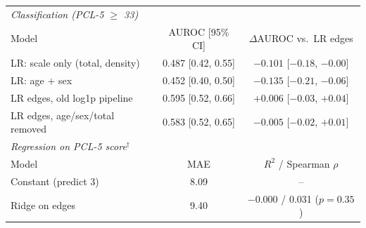 \begin{tabular}{lcc}
\toprule
\multicolumn{3}{l}{\emph{Classification (PCL-5 $\geq$ 33)}} \\
Model & AUROC [95\% CI] & $\Delta$AUROC vs.\ LR edges \\
\midrule
LR: scale only (total, density) & 0.487 [0.42, 0.55] & $-0.101$ [$-0.18$, $-0.00$] \\
LR: age + sex & 0.452 [0.40, 0.50] & $-0.135$ [$-0.21$, $-0.06$] \\
LR edges, old log1p pipeline & 0.595 [0.52, 0.66] & $+0.006$ [$-0.03$, $+0.04$] \\
LR edges, age/sex/total removed & 0.583 [0.52, 0.65] & $-0.005$ [$-0.02$, $+0.01$] \\
\midrule
\multicolumn{3}{l}{\emph{Regression on PCL-5 score}$^\dagger$} \\
Model & MAE & $R^2$ / Spearman $\rho$ \\
\midrule
Constant (predict 3) & 8.09 & -- \\
Ridge on edges & 9.40 & $-0.000$ / 0.031 ($p=0.35$) \\
\bottomrule
\end{tabular}

